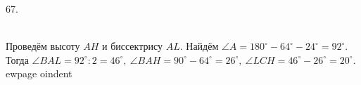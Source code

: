 67. \begin{figure}[ht!]
\end{figure}\\
Проведём высоту $AH$ и биссектрису $AL.$ Найдём $\angle A=180^\circ-64^\circ-24^\circ=92^\circ.$ Тогда $\angle BAL=92^\circ:2=46^\circ,\ \angle BAH=90^\circ-64^\circ=26^\circ,\ \angle LCH=46^\circ-26^\circ=20^\circ.$
ewpage
oindent
